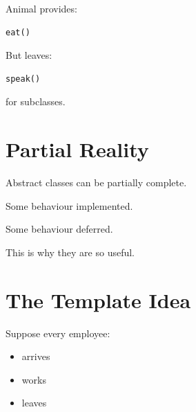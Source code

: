 \documentclass[11pt,a4paper]{book}
\begin{document}

Animal provides:

\begin{verbatim}
eat()
\end{verbatim}


But leaves:

\begin{verbatim}
speak()
\end{verbatim}

for subclasses.


\section{Partial Reality}

\begin{idea}

Abstract classes can be partially complete.

\end{idea}


Some behaviour implemented.


Some behaviour deferred.


This is why they are so useful.


\section{The Template Idea}

Suppose every employee:

\begin{itemize}
\item arrives
\item works
\item leaves
\end{itemize}

\end{document}
